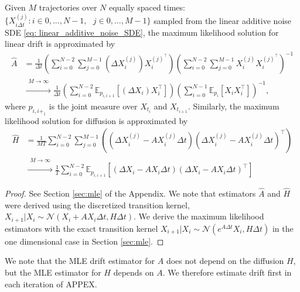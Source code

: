 \documentclass[twoside,11pt]{article}
\newcommand{\E} {\mathbb{E}}
\begin{document}
\begin{prop} 
Given $M$ trajectories over $N$ equally spaced times: $\{ X_{i\Delta t}^{(j)} : i \in 0, ..., N-1, \text{ } j \in 0, ..., M-1\}$ sampled from the linear additive noise SDE \eqref{eq: linear_additive_noise_SDE}, the maximum likelihood solution for linear drift is approximated by 
\begin{align}
\hat{A}&= \frac{1}{\Delta t}\left(\sum_{i=0}^{N-2} \sum_{j=0}^{M-1}(\Delta X_{i}^{(j)})  X_{i}^{{(j)}^\top}\right)\left(\sum_{i=0}^{N-2} \sum_{j=0}^{M-1} X_{i}^{(j)}X_{i}^{{(j)}^\top}\right)^{-1}
\\
&\overset{\substack{M \to \infty \\[2pt]}}{\longrightarrow}
 \frac{1}{\Delta t}\left(\sum_{i=0}^{N-2}   \E_{p_{i,i+1}}[(\Delta X_{i})X_{i}^\top]\right)\left(\sum_{i=0}^{N-1}   \E_{p_i}[X_{i}X_{i}^\top]\right)^{-1},
\label{eq: mle_drift}
\end{align}
where $p_{i,i+_1}$ is the joint measure over $X_{t_i}$ and $X_{t_{i+1}}$. Similarly, the maximum likelihood solution for diffusion is approximated by
\begin{align}
\hat{H}&= \frac{1}{MT}\sum_{i=0}^{N-2}\sum_{j=0}^{M-1} \left( (\Delta X_i^{(j)} - AX_{{i}}^{(j)}\Delta t)(\Delta X_i^{(j)} - AX_{{i}}^{(j)}\Delta t)^\top \right)\\
&\overset{\substack{M \to \infty \\[2pt]}}{\longrightarrow}
\frac{1}{T}\sum_{i=0}^{N-2}   \E_{p_{i,i+1}}[\left(\Delta X_{i}  -AX_i\Delta t\right) \left(\Delta X_{i}  -AX_i\Delta t\right) ^\top ]
\label{eq: mle_diffusion}
\end{align}
\label{prop: MLE_SDE_params}
\end{prop}
\begin{proof}
See Section \ref{sec:mle} of the Appendix. We note that estimators $\hat{A}$ and $\hat{H}$ were derived using the discretized transition kernel, $X_{i+1}| X_i \sim \mathcal{N}(X_i + AX_i\Delta t, H\Delta t)$. We derive the maximum likelihood estimators with the exact transition kernel $X_{i+1}| X_i \sim \mathcal{N}(e^{A\Delta t}X_i, H\Delta t)$ in the one dimensional case in Section \ref{sec:mle}.
\end{proof}

We note that the MLE drift estimator for $A$ does not depend on the diffusion $H$, but the MLE estimator for $H$ depends on $A$. We therefore estimate drift first in each iteration of APPEX. 
\end{document}
